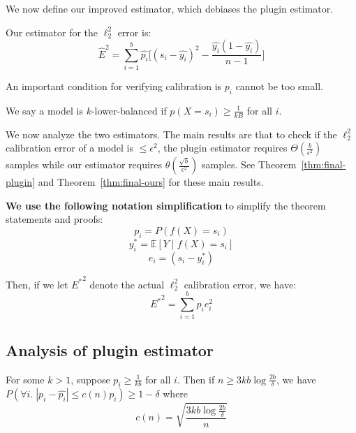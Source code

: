 We now define our improved estimator, which debiases the plugin estimator.

\begin{definition}
Our estimator for the $\ell_2^2$ error is:
\[ \hat{E}^2 = \sum_{i=1}^b \hat{p_i} \Big[ (s_i - \hat{y_i})^2 - \frac{\hat{y_i}(1 - \hat{y_i})}{n-1} \Big] \]
\end{definition}

An important condition for verifying calibration is $p_i$ cannot be too small.

\begin{definition}
\label{dfn:low-bal}
We say a model is $k$-lower-balanced if $p(X = s_i) \geq \frac{1}{kB}$ for all $i$.
\end{definition}
 
We now analyze the two estimators. The main results are that to check if the $\ell_2^2$ calibration error of a model is $\leq \epsilon^2$, the plugin estimator requires $\Theta(\frac{b}{\epsilon^2})$ samples while our estimator requires $\theta(\frac{\sqrt{b}}{\epsilon^2})$ samples. See Theorem~\ref{thm:final-plugin} and Theorem~\ref{thm:final-ours} for these main results.

\textbf{We use the following notation simplification} to simplify the theorem statements and proofs:
\[ p_i = P(f(X) = s_i) \]
\[ y_i^* = \mathbb{E}[Y \; | \; f(X) = s_i] \]
\[ e_i = (s_i - y_i^*) \]

Then, if we let ${E^*}^2$ denote the actual $\ell_2^2$ calibration error, we have:
\[ {E^*}^2 = \sum_{i=1}^b p_i e_i^2 \]
\subsection{Analysis of plugin estimator}
\begin{lemma}
\label{lemma:c_n_lemma}
For some $k > 1$, suppose $p_i \geq \frac{1}{kb}$ for all $i$. Then if $n \geq 3kb \log{\frac{2b}{\delta}}$, we have $P(\forall i . \; |p_i - \hat{p_i}| \leq c(n) p_i) \geq 1 - \delta$ where
\[ c(n) = \sqrt{\frac{3kb \log{\frac{2b}{\delta}}}{n}} \]
\end{lemma}


